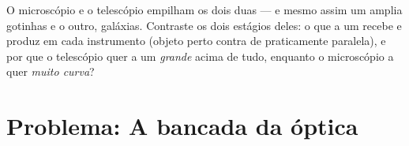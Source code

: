 \begin{exercise}[$\star\star\star$]\label{exo:g8:lenses-images:12}
O microscópio e o telescópio empilham os dois duas  --- e mesmo assim um amplia gotinhas e o outro,
galáxias. Contraste os dois estágios deles: o que a  um recebe e
produz em cada instrumento (objeto perto contra  de 
praticamente paralela), e por que o telescópio quer a  um
\emph{grande} acima de tudo, enquanto o microscópio a quer
\emph{muito curva}?
\end{exercise}

\section{Problema: A bancada da óptica}

